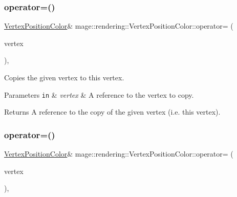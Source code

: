 \subsubsection{\texorpdfstring{operator=()}{operator=()}\hspace{0.1cm}{\footnotesize\ttfamily [1/2]}}
{\footnotesize\ttfamily \mbox{\hyperlink{structmage_1_1rendering_1_1_vertex_position_color}{Vertex\+Position\+Color}}\& mage\+::rendering\+::\+Vertex\+Position\+Color\+::operator= (\begin{DoxyParamCaption}\item[{const \mbox{\hyperlink{structmage_1_1rendering_1_1_vertex_position_color}{Vertex\+Position\+Color}} \&}]{vertex }\end{DoxyParamCaption})\hspace{0.3cm}{\ttfamily [default]}, {\ttfamily [noexcept]}}

Copies the given vertex to this vertex.


\begin{DoxyParams}[1]{Parameters}
\mbox{\tt in}  & {\em vertex} & A reference to the vertex to copy. \\
\hline
\end{DoxyParams}
\begin{DoxyReturn}{Returns}
A reference to the copy of the given vertex (i.\+e. this vertex). 
\end{DoxyReturn}
\mbox{\label{structmage_1_1rendering_1_1_vertex_position_color_a08948aa9942c9a15e6d325ba95321328}} 
\subsubsection{\texorpdfstring{operator=()}{operator=()}\hspace{0.1cm}{\footnotesize\ttfamily [2/2]}}
{\footnotesize\ttfamily \mbox{\hyperlink{structmage_1_1rendering_1_1_vertex_position_color}{Vertex\+Position\+Color}}\& mage\+::rendering\+::\+Vertex\+Position\+Color\+::operator= (\begin{DoxyParamCaption}\item[{\mbox{\hyperlink{structmage_1_1rendering_1_1_vertex_position_color}{Vertex\+Position\+Color}} \&\&}]{vertex }\end{DoxyParamCaption})\hspace{0.3cm}{\ttfamily [default]}, {\ttfamily [noexcept]}}

